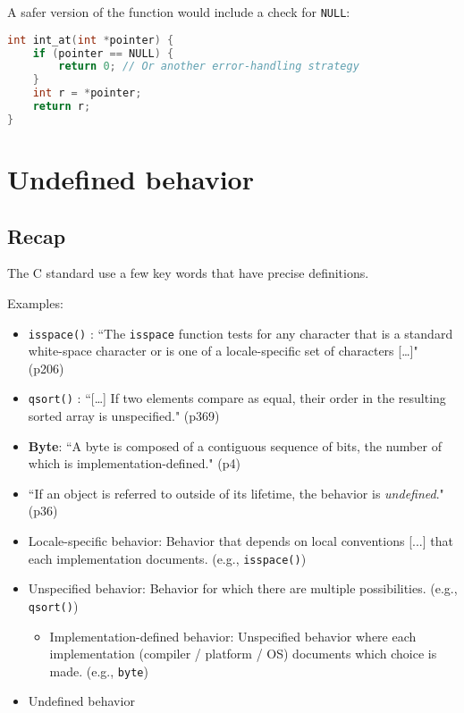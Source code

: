 \documentclass[12pt]{article}
\begin{document}
A safer version of the function would include a check for \texttt{NULL}:

\begin{lstlisting}[language=C]
int int_at(int *pointer) {
    if (pointer == NULL) {
        return 0; // Or another error-handling strategy
    }
    int r = *pointer;
    return r;
}
\end{lstlisting}






















\newpage
\section{Undefined behavior}

\subsection{Recap}
The C standard use a few key words that have precise definitions.

Examples:
\begin{itemize}
    \item \texttt{isspace()} : ``The \texttt{isspace} function tests for any character that is a standard white-space character or is one of a locale-specific set of characters [\ldots]" (p206)
    \item \texttt{qsort()} : ``[\ldots] If two elements compare as equal, their order in the resulting sorted array is unspecified." (p369)
    \item \textbf{Byte}: ``A byte is composed of a contiguous sequence of bits, the number of which is implementation-defined." (p4)
    \item ``If an object is referred to outside of its lifetime, the behavior is \emph{undefined}." (p36)
  \item Locale-specific behavior: Behavior that depends on local conventions [...] that each implementation documents. (e.g., \texttt{isspace()})
  
  \item Unspecified behavior: Behavior for which there are multiple possibilities. (e.g., \texttt{qsort()})
  
  \begin{itemize}
    \item Implementation-defined behavior: Unspecified behavior where each implementation (compiler / platform / OS) documents which choice is made. (e.g., \texttt{byte})
  \end{itemize}
  
  \item Undefined behavior
\end{itemize}
\end{document}
